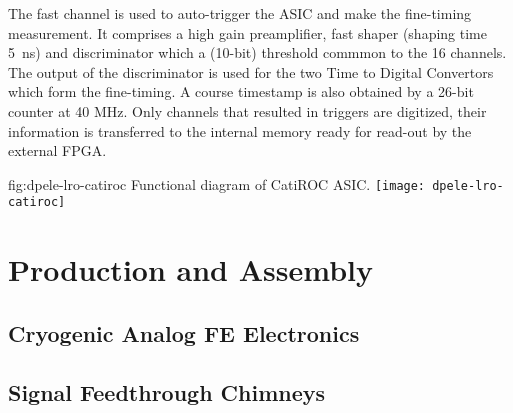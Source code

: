 The fast channel is used to auto-trigger the ASIC and make the fine-timing measurement. It comprises a high gain preamplifier, fast shaper (shaping time \SI{5}{ns}) and discriminator which a (10-bit) threshold commmon to the 16 channels. The output of the discriminator is used for the two Time to Digital Convertors which form the fine-timing. A course timestamp is also obtained by a 26-bit counter at 40 MHz.  Only channels that resulted in triggers are digitized, their information is transferred to the internal memory ready for read-out by the external FPGA.



\begin{dunefigure}{fig:dpele-lro-catiroc}
{Functional diagram of CatiROC ASIC.}
\texttt{[image: dpele-lro-catiroc]}
\end{dunefigure}




\section{Production and Assembly}
\label{sec:fddp-tpc-elec-prod-assy}

\subsection{Cryogenic Analog FE Electronics}
\label{sec:fddp-tpc-elec-prod-fe}

\subsection{Signal Feedthrough Chimneys}
\label{sec:fddp-tpc-elec-prod-sft}

